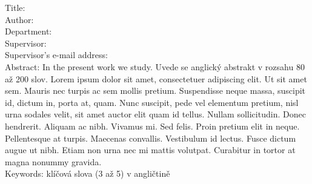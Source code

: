 \vfill %

\noindent
Title: \bcTitleEn\\
Author: \bcAuthor\\
Department: \bcKSVIen\\
Supervisor: \bcTeacher\\
Supervisor's e-mail address: \bcTeacherMail\\

\noindent Abstract: In the present work we study. Uvede se anglický abstrakt v rozsahu 80 až 200 slov. Lorem ipsum dolor sit amet, consectetuer adipiscing elit. Ut sit amet sem. Mauris nec turpis ac sem mollis pretium. Suspendisse neque massa, suscipit id, dictum in, porta at, quam. Nunc suscipit, pede vel elementum pretium, nisl urna sodales velit, sit amet auctor elit quam id tellus. Nullam sollicitudin. Donec hendrerit. Aliquam ac nibh. Vivamus mi. Sed felis. Proin pretium elit in neque. Pellentesque at turpis. Maecenas convallis. Vestibulum id lectus. Fusce dictum augue ut nibh. Etiam non urna nec mi mattis volutpat. Curabitur in tortor at magna nonummy gravida.\\

\noindent Keywords: klíčová slova (3 až 5) v angličtině

\vspace{10mm}

